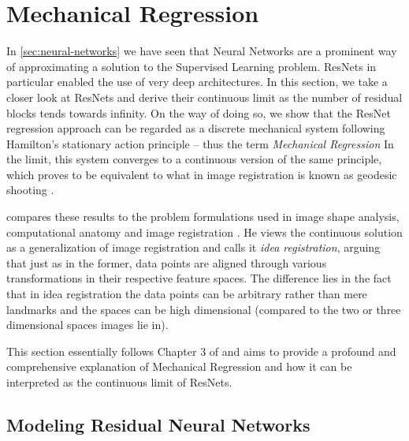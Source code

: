 \section{Mechanical Regression}

In \cref{sec:neural-networks} we have seen that Neural Networks are a prominent way of approximating a solution to the Supervised Learning problem.
ResNets in particular enabled the use of very deep architectures.
In this section, we take a closer look at ResNets and derive their continuous limit as the number of residual blocks tends towards infinity.
On the way of doing so, we show that the ResNet regression approach can be regarded as a discrete mechanical system following Hamilton's stationary action principle -- thus the term \emph{Mechanical Regression}
In the limit, this system converges to a continuous version of the same principle, which proves to be equivalent to what in image registration is known as geodesic shooting \cite{allassonniere05}.

\citet{owhadi20} compares these results to the problem formulations used in image shape analysis, computational anatomy and image registration \cite{bibid}.
He views the continuous solution as a generalization of image registration and calls it \emph{idea registration}, arguing that just as in the former, data points are aligned through various transformations in their respective feature spaces.
The difference lies in the fact that in idea registration the data points can be arbitrary rather than mere landmarks and the spaces can be high dimensional (compared to the two or three dimensional spaces images lie in).

This section essentially follows Chapter 3 of \cite{owhadi20} and aims to provide a profound and comprehensive explanation of Mechanical Regression and how it can be interpreted as the continuous limit of ResNets.

\subsection{Modeling Residual Neural Networks}

